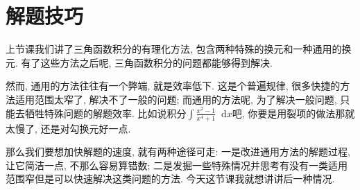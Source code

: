 \documentclass{ctexbook}
\newcommand*{\dif}{\mathop{}\!\mathrm{d}}
\begin{document}
{\section{解题技巧}
上节课我们讲了三角函数积分的有理化方法, 包含两种特殊的换元和一种通用的换元. 有了这些方法之后呢, 三角函数积分的问题都能够得到解决. \par
然而, 通用的方法往往有一个弊端, 就是效率低下. 这是个普遍规律, 很多快捷的方法适用范围太窄了, 解决不了一般的问题; 而通用的方法呢, 为了解决一般问题, 只能去牺牲特殊问题的解题效率. 比如说积分$\int\frac{x^{2}-1}{x^{4}+1}\dif{x}$吧, 你要是用裂项的做法那就太慢了, 还是对勾换元好一点. \par
那么我们要想加快解题的速度, 就有两种途径可走: 一是改进通用方法的解题过程, 让它简洁一点, 不那么容易算错数; 二是发掘一些特殊情况并思考有没有一类适用范围窄但是可以快速解决这类问题的方法. 今天这节课我就想讲讲后一种情况. \par
}
\end{document}
